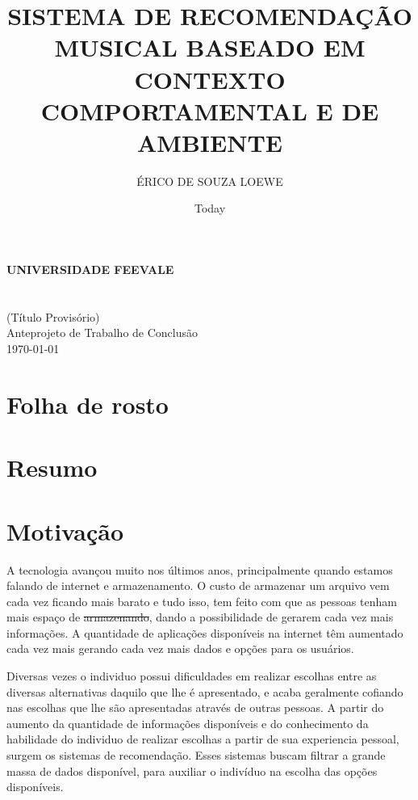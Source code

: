 \documentclass{article}
\title{SISTEMA DE RECOMENDAÇÃO MUSICAL BASEADO EM CONTEXTO COMPORTAMENTAL E DE AMBIENTE}
\author{ÉRICO DE SOUZA LOEWE}
\date{Today}
\begin{document}
\makeatletter
\begin{titlepage}
   \begin{center}
      \large\textbf{
      UNIVERSIDADE FEEVALE\\
      \@author\\
      \@title\\
      }
      (Título Provisório)\\
      Anteprojeto de Trabalho de Conclusão\\
      \today
   \end{center}
\end{titlepage}
\makeatother

\section{Folha de rosto}
\newpage

\section{Resumo}
\newpage

\section{Motivação}

A tecnologia avançou muito nos últimos anos, 
{\color{red} principalmente quando estamos falando de internet e armazenamento.} \cite{muraro2009avanccos} 
O custo de armazenar um arquivo vem cada vez ficando mais barato e tudo isso, tem feito com que as pessoas tenham mais espaço de \st{armazenando}, dando a possibilidade de gerarem cada vez mais informações. {\color{red} \cite{ufc2020amagnetorresistencia}}
A quantidade de aplicações disponíveis na internet t{\color{red}ê}m aumentado cada vez mais gerando cada vez mais dados e opções para os usuários.%

Diversas vezes o individuo possui dificuldades em realizar escolhas entre as diversas alternativas {\color{red} daquilo} que lhe é apresentado, e acaba geralmente cofiando nas escolhas que lhe são apresentadas através de outras pessoas. \cite{resnick1997recommender} A partir do aumento da quantidade de informações disponíveis e do conhecimento da habilidade do individuo de realizar escolhas a partir de sua experiencia pessoal, surgem os sistemas de recomendação. {\color{red} Esses sistemas } buscam filtrar a grande massa de dados disponível, para auxiliar o indivíduo na escolha das opções disponíveis.
\end{document}

